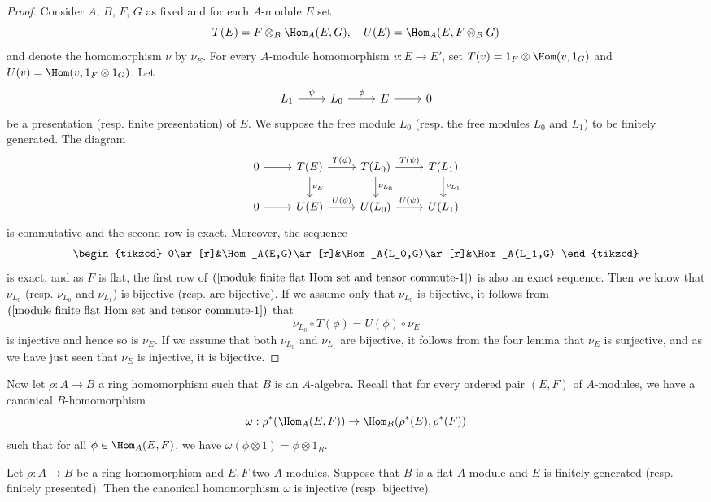 \begin{proof}
Consider $A$, $B$, $F$, $G$ as fixed and for each $A$-module $E$ set
\[T(E)=F\otimes_B\Hom_A(E,G),\quad U(E)=\Hom_A(E,F\otimes_BG)\]
and denote the homomorphism $\nu$ by $\nu_E$. For every $A$-module homomorphism $v:E\to E'$, set $T(v)=1_F\otimes\Hom(v,1_G)$ and $U(v)=\Hom(v,1_F\otimes 1_G)$. Let
\[\begin{tikzcd}
L_1\ar[r,"\psi"]&L_0\ar[r,"\phi"]&E\ar[r]&0 \end{tikzcd}\]
be a presentation (resp. finite presentation) of $E$. We suppose the free module $L_0$ (resp. the free modules $L_0$ and $L_1$) to be finitely generated. The diagram
\begin{equation}\label{module finite flat Hom set and tensor commute-1}
\begin{tikzcd}
0\ar[r]&T(E)\ar[r,"T(\phi)"]\ar[d,"\nu_E"]&T(L_0)\ar[r,"T(\psi)"]\ar[d,"\nu_{L_0}"]&T(L_1)\ar[d,"\nu_{L_1}"]\\
0\ar[r]&U(E)\ar[r,"U(\phi)"]&U(L_0)\ar[r,"U(\psi)"]&U(L_1)
\end{tikzcd}
\end{equation}
is commutative and the second row is exact. Moreover, the sequence
\[\begin{tikzcd}
0\ar[r]&\Hom_A(E,G)\ar[r]&\Hom_A(L_0,G)\ar[r]&\Hom_A(L_1,G)
\end{tikzcd}\]
is exact, and as $F$ is flat, the first row of $(\ref{module finite flat Hom set and tensor commute-1})$ is also an exact sequence. Then we know that $\nu_{L_0}$ (resp. $\nu_{L_0}$ and $\nu_{L_1}$) is bijective (resp. are bijective). If we assume only that $\nu_{L_0}$ is bijective, it follows from $(\ref{module finite flat Hom set and tensor commute-1})$ that
\[\nu_{L_0}\circ T(\phi)=U(\phi)\circ\nu_E\]
is injective and hence so is $\nu_E$. If we assume that both $\nu_{L_0}$ and $\nu_{L_1}$ are bijective, it follows from the four lemma that $\nu_E$ is surjective, and as we have just seen that $\nu_E$ is injective, it is bijective.
\end{proof}
Now let $\rho:A\to B$ a ring homomorphism such that $B$ is an $A$-algebra. Recall that for every ordered pair $(E,F)$ of $A$-modules, we have a canonical $B$-homomorphism
\[\omega:\rho^*(\Hom_A(E,F))\to\Hom_B(\rho^*(E),\rho^*(F))\]
such that for all $\phi\in\Hom_A(E,F)$, we have $\omega(\phi\otimes 1)=\phi\otimes 1_B$.
\begin{proposition}\label{module flat algebra extension of Hom}
Let $\rho:A\to B$ be a ring homomorphism and $E,F$ two $A$-modules. Suppose that $B$ is a flat $A$-module and $E$ is finitely generated (resp. finitely presented). Then the canonical homomorphism $\omega$ is injective (resp. bijective).
\end{proposition}
